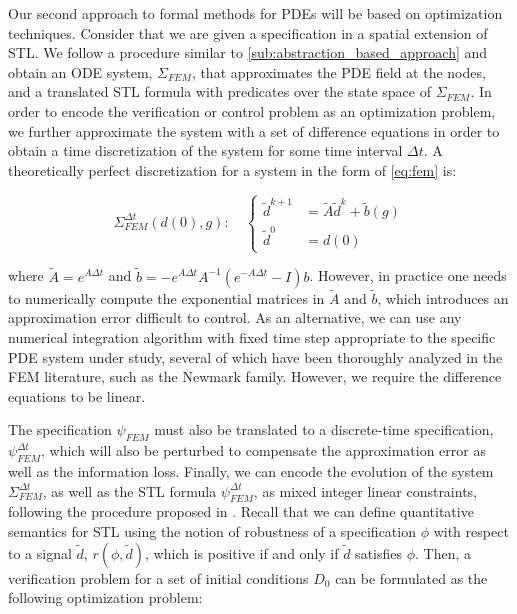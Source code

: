 \documentclass{article}
\begin{document}
Our second approach to formal methods for PDEs will be based on optimization
techniques. Consider that we are given a specification in a spatial extension of
STL. We follow a procedure similar to \cref{sub:abstraction_based_approach} and
obtain an ODE system, $\Sigma_{FEM}$, that approximates the PDE field at the nodes, and a
translated STL formula with predicates over the state space of $\Sigma_{FEM}$.
In order to encode the verification or control problem as an optimization
problem, we further approximate the system with a set of difference equations
in order to obtain a time discretization of the system for some time interval
$\Delta t$. A theoretically
perfect discretization for a system in the form of \cref{eq:fem} is:

\begin{equation}
    \label{eq:disc_system}
    \Sigma_{FEM}^{\Delta t}(d(0), g) : \quad \left\{
    \begin{aligned}
        \tilde d^{k+1} &= \tilde A \tilde d^k + \tilde b(g) \\
        \tilde d^0 &= d(0)
    \end{aligned}
    \right.
\end{equation}

where $\tilde A = e^{A \Delta t}$ and $\tilde b = - e^{A \Delta t} A^{-1} \left
( e^{- A \Delta t} - I \right ) b$. However, in practice one needs to numerically compute the
exponential matrices in $\tilde A$ and $\tilde b$, which introduces an
approximation error difficult to control. As an alternative, we can use any
numerical integration algorithm with fixed time step appropriate to the specific
PDE system under study, several of which have been
thoroughly analyzed in the FEM literature, such as the Newmark family. However,
we require the difference equations to be linear.

The specification $\psi_{FEM}$ must also be translated to a discrete-time
specification, $\psi_{FEM}^{\Delta t}$, which will also be perturbed 
to compensate the approximation error as well as the information loss. Finally,
we can encode the evolution of the system $\Sigma_{FEM}^{\Delta t}$, as well as
the STL formula $\psi_{FEM}^{\Delta t}$, as mixed integer linear constraints,
following the procedure proposed in \cite{sadra's paper}. Recall that we can
define quantitative semantics for STL using the notion of robustness of a
specification $\phi$ with respect to a signal $\tilde d$, $r(\phi, \tilde d)$,
which is positive if and only if $\tilde d$ satisfies $\phi$. Then, a verification problem
for a set of initial conditions $D_0$ can be formulated as the following
optimization problem:
\end{document}
